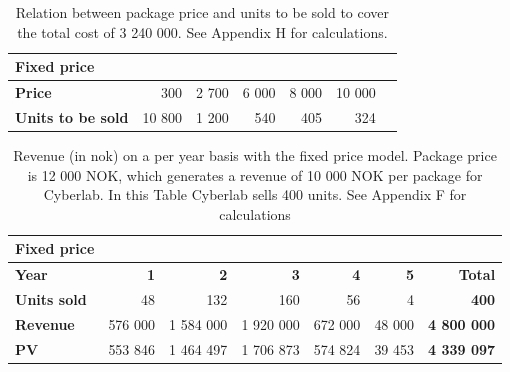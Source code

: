 \begin{table}
\centering
\caption[Price and unit examples with the fixed price model]{Relation between package price and units to be sold to cover the total cost of 3 240 000. See Appendix H for calculations.}
    \begin{tabular}{|l|r|r|r|r|r|r|}
        \hline
       \textbf{Fixed price}  & & & & & \\ \hline
      \textbf{Price} & 300 & 2 700 & 6 000 & 8 000 & 10 000 \\ \hline
	   \textbf{Units to be sold} & 10 800 & 1 200 & 540 & 405 & 324 \\ \hline	
    \end{tabular}
    \label{tab:unitsfixed}
\end{table}
\begin{table}
\caption[Revenue with use of fixed price model]{Revenue (in \ac{nok}) on a per year basis with the fixed price model. Package price is 12 000 NOK, which generates a revenue of 10 000 NOK per package for Cyberlab. In this Table Cyberlab sells 400 units. See Appendix F for calculations}
    \begin{tabular}{|l|r|r|r|r|r|r|}
        \hline
       \textbf{Fixed price}  & & & & & & \\ \hline
      \textbf{Year} & \textbf{1} & \textbf{2} & \textbf{3} & \textbf{4} & \textbf{5} & \textbf{Total}\\ \hline
	   \textbf{Units sold} & 48 & 132 & 160 & 56 & 4 & \textbf{400}\\ \hline
	   \textbf{Revenue} & 576 000 & 1 584 000 & 1 920 000 & 672 000 & 48 000 & \textbf{4 800 000} \\ \hline  
	   \textbf{PV} & 553 846 & 1 464 497 & 1 706 873 & 574 824 & 39 453 & \textbf{4 339 097}  \\ \hline
    \end{tabular}
    \label{tab:revfixed}
\end{table}

